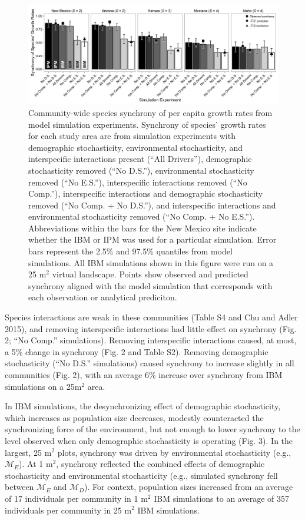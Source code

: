 \documentclass[12pt,]{article}
\begin{document}
\begin{figure}[!ht]
  \centering
      \includegraphics[width=6in]{./components/formatted_figures/formatted_figure1.png}
  \caption{Community-wide species synchrony of per capita growth rates from model simulation experiments. Synchrony of species' growth rates for each study area are from simulation experiments with demographic stochasticity, environmental stochasticity, and interspecific interactions present (``All Drivers''), demographic stochasticity removed (``No D.S.''), environmental stochasticity removed (``No E.S.''), interspecific interactions removed (``No Comp.''), interspecific interactions and demographic stochasticity removed (``No Comp. + No D.S.''), and interspecific interactions and environmental stochasticity removed (``No Comp. + No E.S.''). Abbreviations within the bars for the New Mexico site indicate whether the IBM or IPM was used for a particular simulation. Error bars represent the 2.5\% and 97.5\% quantiles from model simulations. All IBM simulations shown in this figure were run on a 25 $\text{m}^2$ virtual landscape. Points show observed and predicted synchrony aligned with the model simulation that corresponds with each observation or analytical prediciton.}
\end{figure}

Species interactions are weak in these communities (Table S4 and Chu and
Adler 2015), and removing interspecific interactions had little effect
on synchrony (Fig. 2; ``No Comp.'' simulations). Removing interspecific
interactions caused, at most, a 5\% change in synchrony (Fig. 2 and
Table S2). Removing demographic stochasticity (``No D.S.'' simulations)
caused synchrony to increase slightly in all communities (Fig. 2), with
an average 6\% increase over synchrony from IBM simulations on a
25\(\text{m}^2\) area.

In IBM simulations, the desynchronizing effect of demographic
stochasticity, which increases as population size decreases, modestly
counteracted the synchronizing force of the environment, but not enough
to lower synchrony to the level observed when only demographic
stochasticity is operating (Fig. 3). In the largest, 25 \(\text{m}^2\)
plots, synchrony was driven by environmental stochasticity (e.g.,
\(\mathcal{M}_E\)). At 1 \(\text{m}^2\), synchrony reflected
the combined effects of demographic stochasticity and
environmental stochasticity (e.g.,
simulated synchrony fell between \(\mathcal{M}_E\) and
\(\mathcal{M}_D\)). For context, population sizes increased from an
average of 17 individuals per community in 1 \(\text{m}^2\) IBM
simulations to an average of 357 individuals per community in 25
\(\text{m}^2\) IBM simulations.
\end{document}
